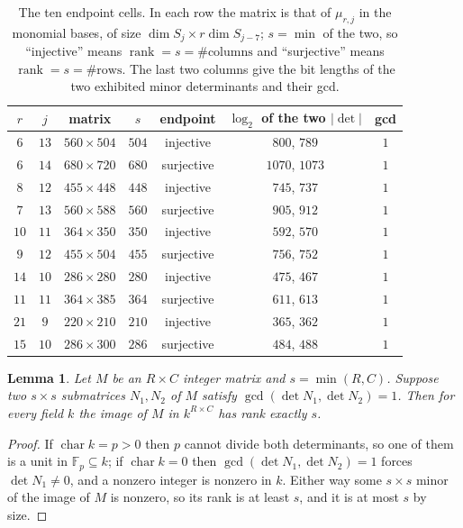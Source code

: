 \documentclass[11pt]{amsart}
\newtheorem{lemma}[theorem]{Lemma}
\theoremstyle{remark}
\DeclareMathOperator{\rank}{rank}
\newcommand{\FF}{\mathbb F}
\begin{document}
\begin{table}[ht]
\caption{The ten endpoint cells. In each row the matrix is that of $\mu_{r,j}$
in the monomial bases, of size $\dim S_j\times r\dim S_{j-7}$;
$s=\min$ of the two, so ``injective'' means $\rank=s=\#\text{columns}$ and
``surjective'' means $\rank=s=\#\text{rows}$. The last two columns give the bit
lengths of the two exhibited minor determinants and their gcd.}
\begin{center}
\begin{tabular}{ccccccc}
$r$ & $j$ & matrix & $s$ & endpoint & $\log_2$ of the two $|\det|$ & gcd\\\hline
$6$ & $13$ & $560\times 504$ & $504$ & injective & $800$, $789$ & $1$ \\
$6$ & $14$ & $680\times 720$ & $680$ & surjective & $1070$, $1073$ & $1$ \\
$8$ & $12$ & $455\times 448$ & $448$ & injective & $745$, $737$ & $1$ \\
$7$ & $13$ & $560\times 588$ & $560$ & surjective & $905$, $912$ & $1$ \\
$10$ & $11$ & $364\times 350$ & $350$ & injective & $592$, $570$ & $1$ \\
$9$ & $12$ & $455\times 504$ & $455$ & surjective & $756$, $752$ & $1$ \\
$14$ & $10$ & $286\times 280$ & $280$ & injective & $475$, $467$ & $1$ \\
$11$ & $11$ & $364\times 385$ & $364$ & surjective & $611$, $613$ & $1$ \\
$21$ & $9$ & $220\times 210$ & $210$ & injective & $365$, $362$ & $1$ \\
$15$ & $10$ & $286\times 300$ & $286$ & surjective & $484$, $488$ & $1$ \\
\end{tabular}
\end{center}
\end{table}

\begin{lemma}\label{lem:puniform}
Let $M$ be an $R\times C$ integer matrix and $s=\min(R,C)$. Suppose two
$s\times s$ submatrices $N_1,N_2$ of $M$ satisfy
$\gcd(\det N_1,\det N_2)=1$. Then for every field $k$ the image of $M$ in
$k^{R\times C}$ has rank exactly $s$.
\end{lemma}

\begin{proof}
If $\operatorname{char}k=p>0$ then $p$ cannot divide both determinants, so one
of them is a unit in $\FF_p\subseteq k$; if $\operatorname{char}k=0$ then
$\gcd(\det N_1,\det N_2)=1$ forces $\det N_1\ne0$, and a nonzero integer is
nonzero in $k$. Either way some $s\times s$ minor of the image of $M$ is
nonzero, so its rank is at least $s$, and it is at most $s$ by size.
\end{proof}
\end{document}
